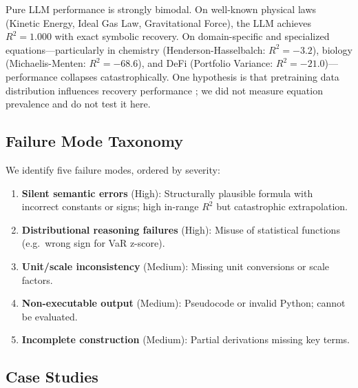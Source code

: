 \documentclass[twoside,11pt]{article}
\newcommand{\Rsq}{R^{2}}
\begin{document}
Pure LLM performance is strongly bimodal. On well-known physical laws (Kinetic Energy, Ideal Gas Law, Gravitational Force), the LLM achieves $\Rsq = 1.000$ with exact symbolic recovery. On domain-specific and specialized equations---particularly in chemistry (Henderson-Hasselbalch: $\Rsq = -3.2$), biology (Michaelis-Menten: $\Rsq = -68.6$), and DeFi (Portfolio Variance: $\Rsq = -21.0$)---performance collapses catastrophically. One hypothesis is that pretraining data distribution influences recovery performance \citep{kambhampati2024llms}; we did not measure equation prevalence and do not test it here.

\subsection{Failure Mode Taxonomy}\label{subsec:failure-mode-taxonomy}
\label{sec:llm_failures}

We identify five failure modes, ordered by severity:
\begin{enumerate}
  \item \textbf{Silent semantic errors} (High): Structurally plausible formula with incorrect constants or signs; high in-range $\Rsq$ but catastrophic extrapolation.
  \item \textbf{Distributional reasoning failures} (High): Misuse of statistical functions (e.g.\ wrong sign for VaR z-score).
  \item \textbf{Unit/scale inconsistency} (Medium): Missing unit conversions or scale factors.
  \item \textbf{Non-executable output} (Medium): Pseudocode or invalid Python; cannot be evaluated.
  \item \textbf{Incomplete construction} (Medium): Partial derivations missing key terms.
\end{enumerate}

\subsection{Case Studies}\label{subsec:case-studies}
\label{sec:llm_cases}
\end{document}
